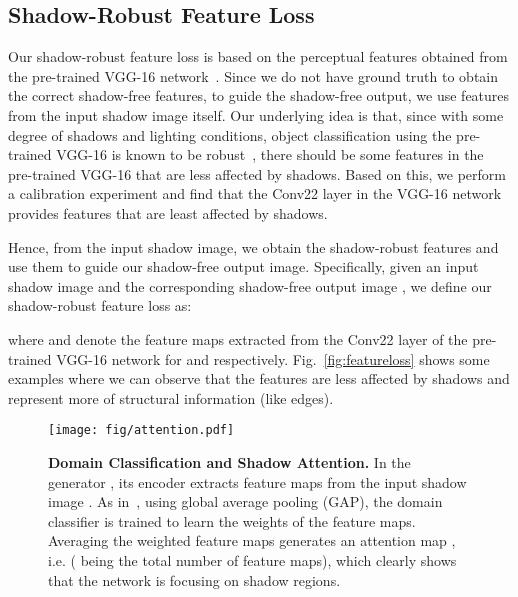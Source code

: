 \documentclass[10pt,twocolumn,letterpaper]{article}
\begin{document}
\subsection{Shadow-Robust Feature Loss}
Our shadow-robust feature loss is based on the perceptual features obtained from the pre-trained VGG-16 network~\cite{Johnson16, sharma2020nighttime}. 
Since we do not have ground truth to obtain the correct shadow-free features, to guide the shadow-free output, we use features from the input shadow image itself. 
Our underlying idea is that, since with some degree of shadows and lighting conditions, object classification using the pre-trained VGG-16 is known to be robust~\cite{webster2018psyphy}, there should be some features in the pre-trained VGG-16 that are less affected by shadows. Based on this, we perform a calibration experiment and find that the Conv22 layer in the VGG-16 network provides features that are least affected by shadows. 

Hence, from the input shadow image, we obtain the shadow-robust features and use them to guide our shadow-free output image. 
Specifically, given an input shadow image  and the corresponding shadow-free output image , we define our shadow-robust feature loss as:

where  and  denote the feature maps extracted from the Conv22 layer of the pre-trained VGG-16 network for  and  respectively. Fig.~\ref{fig:featureloss} shows some examples where we can observe that the features  are less affected by shadows and represent more of structural information (like edges).

\begin{figure}[t]
	\begin{center}
		\captionsetup[subfigure]{labelformat=empty}
		{\texttt{[image: fig/attention.pdf]}}
		\vspace{-0.125in}	
	\end{center}
	\vspace{-0.2in}
	\caption
	{\textbf{Domain Classification and Shadow Attention.} 
	In the generator , its encoder  extracts feature maps  from the input shadow image . As in~\cite{zhou2016learning}, using global average pooling (GAP), the domain classifier  is trained to learn the weights  of the feature maps. Averaging the weighted feature maps generates an attention map , i.e.  ( being the total number of feature maps), which clearly shows that the network is focusing on shadow regions.}
	\label{fig:camattention}
	\vspace{-0.1in}
\end{figure}
\end{document}
